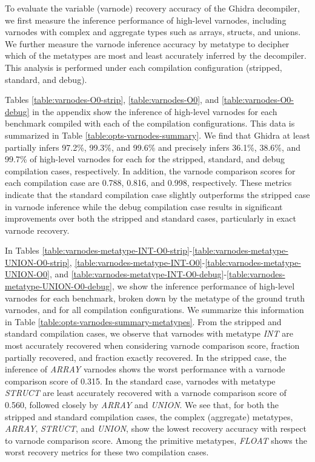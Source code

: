 To evaluate the variable (varnode) recovery accuracy of the Ghidra decompiler, we first measure the inference performance of high-level varnodes, including varnodes with complex and aggregate types such as arrays, structs, and unions. We further measure the varnode inference accuracy by metatype to decipher which of the metatypes are most and least accurately inferred by the decompiler. This analysis is performed under each compilation configuration (stripped, standard, and debug).



Tables \ref{table:varnodes-O0-strip}, \ref{table:varnodes-O0}, and \ref{table:varnodes-O0-debug} in the appendix show the inference of high-level varnodes for each benchmark compiled with each of the compilation configurations. This data is summarized in Table \ref{table:opts-varnodes-summary}. We find that Ghidra at least partially infers 97.2\%, 99.3\%, and 99.6\% and precisely infers 36.1\%, 38.6\%, and 99.7\% of high-level varnodes for each for the stripped, standard, and debug compilation cases, respectively. In addition, the varnode comparison scores for each compilation case are 0.788, 0.816, and 0.998, respectively. These metrics indicate that the standard compilation case slightly outperforms the stripped case in varnode inference while the debug compilation case results in significant improvements over both the stripped and standard cases, particularly in exact varnode recovery.



In Tables \ref{table:varnodes-metatype-INT-O0-strip}-\ref{table:varnodes-metatype-UNION-O0-strip}, \ref{table:varnodes-metatype-INT-O0}-\ref{table:varnodes-metatype-UNION-O0}, and \ref{table:varnodes-metatype-INT-O0-debug}-\ref{table:varnodes-metatype-UNION-O0-debug}, we show the inference performance of high-level varnodes for each benchmark, broken down by the metatype of the ground truth varnodes, and for all compilation configurations. We summarize this information in Table \ref{table:opts-varnodes-summary-metatypes}. From the stripped and standard compilation cases, we observe that varnodes with metatype \emph{INT} are most accurately recovered when considering varnode comparison score, fraction partially recovered, and fraction exactly recovered. In the stripped case, the inference of \emph{ARRAY} varnodes shows the worst performance with a varnode comparison score of 0.315. In the standard case, varnodes with metatype \emph{STRUCT} are least accurately recovered with a varnode comparison score of 0.560, followed closely by \emph{ARRAY} and \emph{UNION}. We see that, for both the stripped and standard compilation cases, the complex (aggregate) metatypes, \emph{ARRAY}, \emph{STRUCT}, and \emph{UNION}, show the lowest recovery accuracy with respect to varnode comparison score. Among the primitive metatypes, \emph{FLOAT} shows the worst recovery metrics for these two compilation cases.

